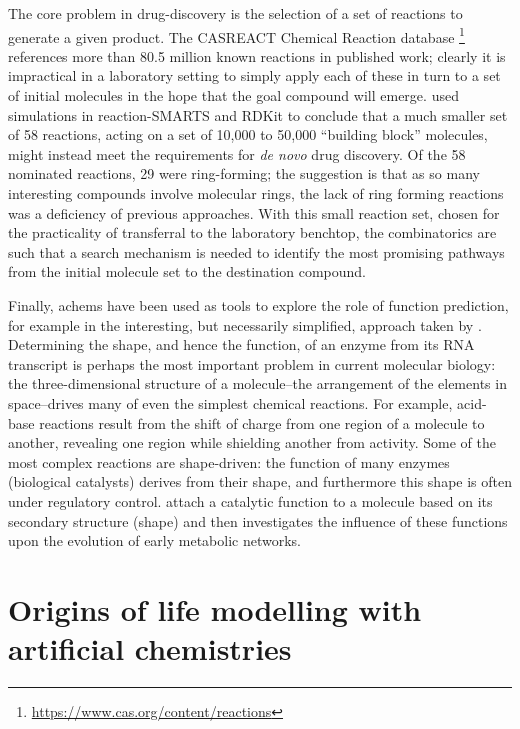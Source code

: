 The core problem in drug-discovery is the selection of a set of reactions to generate a given product. The CASREACT Chemical Reaction database \footnote{\url{https://www.cas.org/content/reactions}} references more than 80.5 million known reactions in published work; clearly it is impractical in a laboratory setting to simply apply each of these in turn to a set of initial molecules in the hope that the goal compound will emerge. \Textcite{Hartenfeller2012} used simulations in reaction-SMARTS and RDKit \parencite{rdkit} to conclude that a much smaller set of 58 reactions, acting on a set of 10,000 to 50,000 ``building block'' molecules, might instead meet the requirements for \textit{de novo} drug discovery. Of the 58 nominated reactions, 29 were ring-forming; the suggestion is that as so many interesting compounds involve molecular rings, the lack of ring forming reactions was a deficiency of previous approaches. With this small reaction set, chosen for the practicality of transferral to the laboratory benchtop, the combinatorics are such that a search mechanism is needed to identify the most promising pathways from the initial molecule set to the destination compound.

Finally, \Glspl{achem} have been used as tools to explore the role of function prediction, for example in the interesting, but necessarily simplified, approach taken by \textcite{Flamm2010,Ullrich2010}. Determining the shape, and hence the function, of an enzyme from its RNA transcript is perhaps the most important problem in current molecular biology: the three-dimensional structure of a molecule--the arrangement of the elements in space--drives many of even the simplest chemical reactions. For example, acid-base reactions result from the shift of charge from one region of a molecule to another, revealing one region while shielding another from activity. Some of the most complex reactions are shape-driven: the function of many enzymes (biological catalysts) derives from their shape, and furthermore this shape is often under regulatory control. \Textcite{Flamm2010,Ullrich2010} attach a catalytic function to a molecule based on its secondary structure (shape) and then investigates the influence of these functions upon the evolution of early metabolic networks. 
	
\section{Origins of life modelling with artificial chemistries}\label{achem-and-ool}

